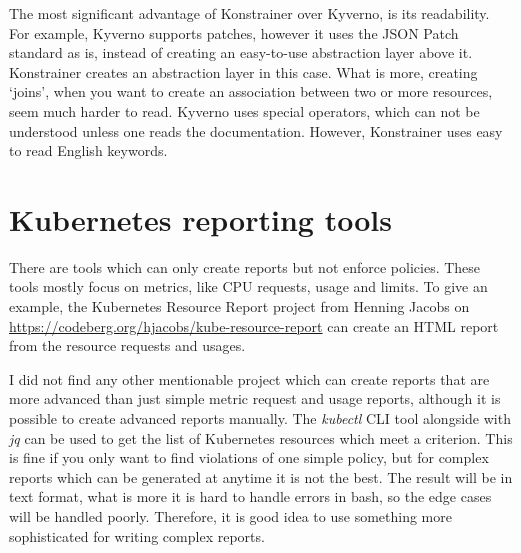 The most significant advantage of Konstrainer over Kyverno, is its readability. For example, Kyverno supports patches, however it uses the JSON Patch standard as is, instead of creating an easy-to-use abstraction layer above it. Konstrainer creates an abstraction layer in this case. What is more, creating `joins', when you want to create an association between two or more resources, seem much harder to read. Kyverno uses special operators, which can not be understood unless one reads the documentation. However, Konstrainer uses easy to read English keywords.

\section{Kubernetes reporting tools}

There are tools which can only create reports but not enforce policies. These tools mostly focus on metrics, like CPU requests, usage and limits. To give an example, the Kubernetes Resource Report project from Henning Jacobs on \url{https://codeberg.org/hjacobs/kube-resource-report} can create an HTML report from the resource requests and usages.

I did not find any other mentionable project which can create reports that are more advanced than just simple metric request and usage reports, although it is possible to create advanced reports manually. The \emph{kubectl} CLI tool alongside with \emph{jq} can be used to get the list of Kubernetes resources which meet a criterion. This is fine if you only want to find violations of one simple policy, but for complex reports which can be generated at anytime it is not the best. The result will be in text format, what is more it is hard to handle errors in bash, so the edge cases will be handled poorly. Therefore, it is good idea to use something more sophisticated for writing complex reports.
